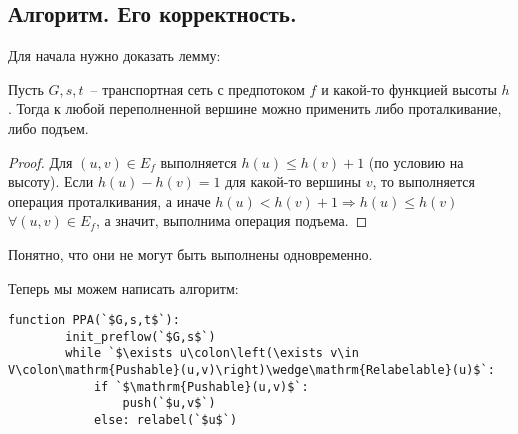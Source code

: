 \subsection{Алгоритм. Его корректность.}
Для начала нужно доказать лемму:
\begin{lemma}\label{someshit8}
	Пусть $G,s,t$~-- транспортная сеть с предпотоком $f$ и какой-то функцией высоты $h$. Тогда к любой переполненной вершине можно применить либо проталкивание, либо подъем.
\end{lemma}
\begin{proof}
	Для $(u,v)\in E_f$ выполняется $h(u)\le h(v)+1$ (по условию на высоту). Если $h(u)-h(v)=1$ для какой-то вершины $v$, то выполняется операция проталкивания, а иначе $h(u)<h(v)+1\Rightarrow h(u)\le h(v)$ $\forall (u,v)\in E_f$, а значит, выполнима операция подъема.
\end{proof}
Понятно, что они не могут быть выполнены одновременно.

Теперь мы можем написать алгоритм:
\begin{lstlisting}[escapeinside=``]
	function PPA(`$G,s,t$`):
		init_preflow(`$G,s$`)
		while `$\exists u\colon\left(\exists v\in V\colon\mathrm{Pushable}(u,v)\right)\wedge\mathrm{Relabelable}(u)$`:
			if `$\mathrm{Pushable}(u,v)$`:
				push(`$u,v$`)
			else: relabel(`$u$`)
\end{lstlisting}


